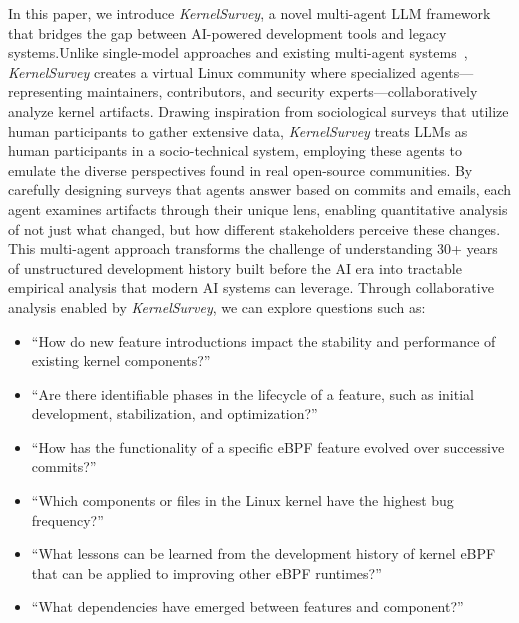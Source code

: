 \documentclass[sigconf,review,anonymous]{acmart}
\newcommand{\sys}{\textit{KernelSurvey}\xspace}
\begin{document}
In this paper, we introduce \sys, a novel multi-agent LLM framework that bridges the gap between AI-powered development tools and legacy systems.Unlike single-model approaches and existing multi-agent systems~\cite{lmase2024,agent4se2024},  \sys creates a virtual Linux community where specialized agents—representing maintainers, contributors, and security experts—collaboratively analyze kernel artifacts. Drawing inspiration from sociological surveys that utilize human participants to gather extensive data, \sys treats LLMs as human participants in a socio-technical system, employing these agents to emulate the diverse perspectives found in real open-source communities. By carefully designing surveys that agents answer based on commits and emails\cite{linux,tan2019communicate,schneider2016differentiating}, each agent examines artifacts through their unique lens, enabling quantitative analysis of not just what changed, but how different stakeholders perceive these changes. This multi-agent approach transforms the challenge of understanding 30+ years of unstructured development history built before the AI era into tractable empirical analysis that modern AI systems can leverage. Through collaborative analysis enabled by \sys, we can explore questions such as:


\begin{itemize}
    \item ``How do new feature introductions impact the stability and performance of existing kernel components?''
    \item ``Are there identifiable phases in the lifecycle of a feature, such as initial development, stabilization, and optimization?''
    \item ``How has the functionality of a specific eBPF feature evolved over successive commits?''
    \item ``Which components or files in the Linux kernel have the highest bug frequency?''
    \item ``What lessons can be learned from the development history of kernel eBPF that can be applied to improving other eBPF runtimes?''
    \item ``What dependencies have emerged between features and component?''
\end{itemize}
\end{document}
